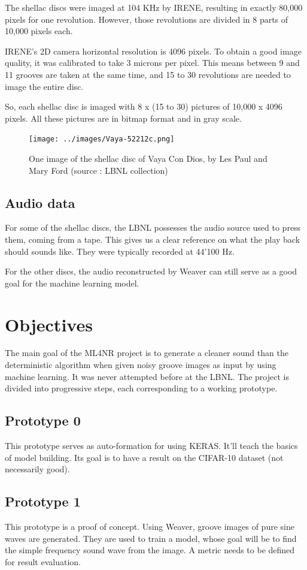 \documentclass[12pt, twoside]{article}
\begin{document}
The shellac discs were imaged at 104 KHz by IRENE, resulting in exactly 80,000 pixels for one revolution. However, those revolutions are divided in 8 parts of 10,000 pixels each. 

IRENE's 2D camera horizontal resolution is 4096 pixels. To obtain a good image quality, it was calibrated to take 3 microns per pixel. This means between 9 and 11 grooves are taken at the same time, and 15 to 30 revolutions are needed to image the entire disc.

So, each shellac disc is imaged with 8 x (15 to 30) pictures of 10,000 x 4096 pixels. All these pictures are in bitmap format and in gray scale.

\begin{figure}
	\centering
	\texttt{[image: ../images/Vaya-52212c.png]}
	\caption{One image of the shellac disc of Vaya Con Dios, by Les Paul and Mary Ford (source : LBNL collection)}
	\label{vaya}
\end{figure}
\subsection{Audio data}
For some of the shellac discs, the LBNL possesses the audio source used to press them, coming from a tape. This gives us a clear reference on what the play back should sounds like. They were typically recorded at 44'100 Hz.

For the other discs, the audio reconstructed by Weaver can still serve as a good goal for the machine learning model. 

\section{Objectives}
The main goal of the ML4NR project is to generate a cleaner sound than the deterministic algorithm when given noisy groove images as input by using machine learning. It was never attempted before at the LBNL. The project is divided into progressive steps, each corresponding to a working prototype.
\subsection{Prototype 0}
This prototype serves as auto-formation for using KERAS. It'll teach the basics of model building. Its goal is to have a result on the CIFAR-10 dataset (not necessarily good). 
\subsection{Prototype 1}
This prototype is a proof of concept. Using Weaver, groove images of pure sine waves are generated. They are used to train a model, whose goal will be to find the simple frequency sound wave from the image. A metric needs to be defined for result evaluation.
\end{document}
